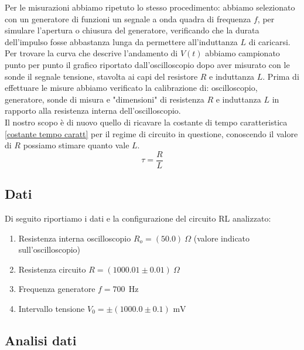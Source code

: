 \documentclass[letterpaper,12pt]{article}
\begin{document}
Per le misurazioni abbiamo ripetuto lo stesso procedimento: abbiamo selezionato con un generatore di funzioni un segnale a onda quadra di frequenza $f$, per simulare l'apertura o chiusura del generatore, verificando che la durata dell'impulso fosse abbastanza lunga da permettere all'induttanza $L$ di caricarsi.
 Per trovare la curva che descrive l'andamento di $V(t)$ abbiamo campionato punto per punto il grafico riportato dall'oscilloscopio dopo aver misurato con le sonde il segnale tensione, stavolta ai capi del resistore $R$ e induttanza $L$. Prima di effettuare le misure abbiamo verificato la calibrazione di: oscilloscopio, generatore, sonde di misura e "dimensioni" di resistenza $R$ e induttanza $L$ in rapporto alla resistenza interna dell'oscilloscopio.\\
Il nostro scopo è di nuovo quello di ricavare la costante di tempo caratteristica \ref{costante tempo caratt} per il regime di circuito in questione, conoscendo il valore di $R$ possiamo stimare quanto vale $L$. 
\begin{equation}
    \tau = \frac{R}{L}
    \label{costante tempo caratt}
\end{equation}
\subsection{Dati} %
Di seguito riportiamo i dati e la configurazione del circuito RL analizzato:
\begin{enumerate}[itemsep=1pt]
    \item Resistenza interna oscilloscopio $R_o = (50.0)\ \Omega$ (valore indicato sull'oscilloscopio)
    \item Resistenza circuito $R = (1000.01\pm0.01)\ \Omega$ %
    \item Frequenza generatore $f = \SI{700}{\ \hertz}$
    \item Intervallo tensione $V_0= \pm (1000.0\pm0.1)\text{ mV}$
\end{enumerate}

\subsection{Analisi dati}
\end{document}
